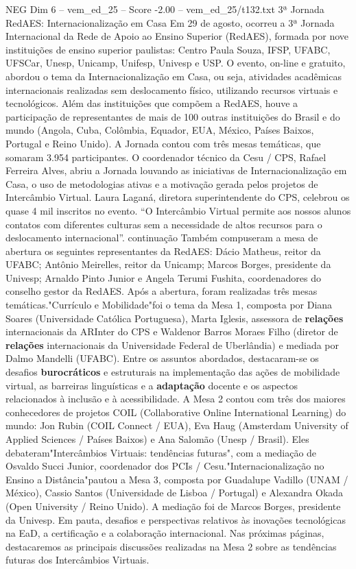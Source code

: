 \begin{textsample}{NEG Dim 6 – vem\_ed\_25 – Score -2.00 – vem\_ed\_25/t132.txt}  \label{ex:f6_neg_061}
3ª Jornada RedAES: Internacionalização em Casa Em 29 de agosto, ocorreu a 3ª Jornada Internacional da Rede de Apoio ao Ensino Superior (RedAES), formada por nove instituições de ensino superior paulistas: Centro Paula Souza, IFSP, UFABC, UFSCar, Unesp, Unicamp, Unifesp, Univesp e USP.
O evento, on-line e gratuito, abordou o tema da Internacionalização em Casa, ou seja, atividades acadêmicas internacionais realizadas sem deslocamento físico, utilizando recursos virtuais e tecnológicos.
Além das instituições que compõem a RedAES, houve a participação de representantes de mais de 100 outras instituições do Brasil e do mundo (Angola, Cuba, Colômbia, Equador, EUA, México, Países Baixos, Portugal e Reino Unido).
A Jornada contou com três mesas temáticas, que somaram 3.954 participantes.
O coordenador técnico da Cesu / CPS, Rafael Ferreira Alves, abriu a Jornada louvando as iniciativas de Internacionalização em Casa, o uso de metodologias ativas e a motivação gerada pelos projetos de Intercâmbio Virtual.
Laura Laganá, diretora superintendente do CPS, celebrou os quase 4 mil inscritos no evento. “O Intercâmbio Virtual permite aos nossos alunos contatos com diferentes culturas sem a necessidade de altos recursos para o deslocamento internacional”. continuação Também compuseram a mesa de abertura os seguintes representantes da RedAES: Dácio Matheus, reitor da UFABC; Antônio Meirelles, reitor da Unicamp; Marcos Borges, presidente da Univesp; Arnaldo Pinto Junior e Angela Terumi Fushita, coordenadores do conselho gestor da RedAES.
Após a abertura, foram realizadas três mesas temáticas."Currículo e Mobilidade"foi o tema da Mesa 1, composta por Diana Soares (Universidade Católica Portuguesa), Marta Iglesis, assessora de \textbf{relações} internacionais da ARInter do CPS e Waldenor Barros Moraes Filho (diretor de \textbf{relações} internacionais da Universidade Federal de Uberlândia) e mediada por Dalmo Mandelli (UFABC).
Entre os assuntos abordados, destacaram-se os desafios \textbf{burocráticos} e estruturais na implementação das ações de mobilidade virtual, as barreiras linguísticas e a \textbf{adaptação} docente e os aspectos relacionados à inclusão e à acessibilidade.
A Mesa 2 contou com três dos maiores conhecedores de projetos COIL (Collaborative Online International Learning) do mundo: Jon Rubin (COIL Connect / EUA), Eva Haug (Amsterdam University of Applied Sciences / Países Baixos) e Ana Salomão (Unesp / Brasil).
Eles debateram"Intercâmbios Virtuais: tendências futuras", com a mediação de Osvaldo Succi Junior, coordenador dos PCIs / Cesu."Internacionalização no Ensino a Distância"pautou a Mesa 3, composta por Guadalupe Vadillo (UNAM / México), Cassio Santos (Universidade de Lisboa / Portugal) e Alexandra Okada (Open University / Reino Unido).
A mediação foi de Marcos Borges, presidente da Univesp.
Em pauta, desafios e perspectivas relativos às inovações tecnológicas na EaD, a certificação e a colaboração internacional.
Nas próximas páginas, destacaremos as principais discussões realizadas na Mesa 2 sobre as tendências futuras dos Intercâmbios Virtuais.

\end{textsample}

